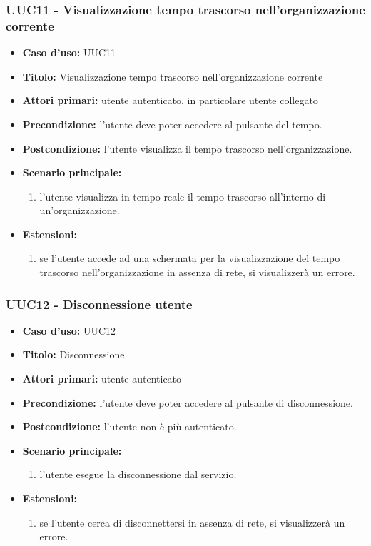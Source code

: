 \documentclass[casi-duso]{subfiles}
\begin{document}
\subsubsection{UUC11 - Visualizzazione tempo trascorso nell'organizzazione corrente}%
\label{subsub:UUC11utente}
\begin{itemize}
  \item \textbf{Caso d’uso:} UUC11
  \item \textbf{Titolo:} Visualizzazione tempo trascorso nell'organizzazione corrente
  \item \textbf{Attori primari:} utente autenticato, in particolare utente collegato
  \item \textbf{Precondizione:} l'utente deve poter accedere al pulsante del tempo.
  \item \textbf{Postcondizione:} l'utente visualizza il tempo trascorso nell'organizzazione.
  \item \textbf{Scenario principale:}
        \begin{enumerate}
          \item l'utente visualizza in tempo reale il tempo trascorso all'interno di un'organizzazione.
        \end{enumerate}
  \item \textbf{Estensioni:}
        \begin{enumerate}
          \item se l'utente accede ad una schermata per la visualizzazione del tempo trascorso nell'organizzazione in assenza di rete, si visualizzerà un errore.
        \end{enumerate}
\end{itemize}

\subsubsection{UUC12 - Disconnessione utente}%
\label{subsub:UUC12utente}
\begin{itemize}
  \item \textbf{Caso d’uso:} UUC12
  \item \textbf{Titolo:} Disconnessione
  \item \textbf{Attori primari:} utente autenticato
  \item \textbf{Precondizione:} l'utente deve poter accedere al pulsante di disconnessione.
  \item \textbf{Postcondizione:} l'utente non è più autenticato.
  \item \textbf{Scenario principale:}
        \begin{enumerate}
          \item l'utente esegue la disconnessione dal servizio.
        \end{enumerate}
  \item \textbf{Estensioni:}
        \begin{enumerate}
          \item se l'utente cerca di disconnettersi in assenza di rete, si visualizzerà un errore.
        \end{enumerate}
\end{itemize}
\end{document}
